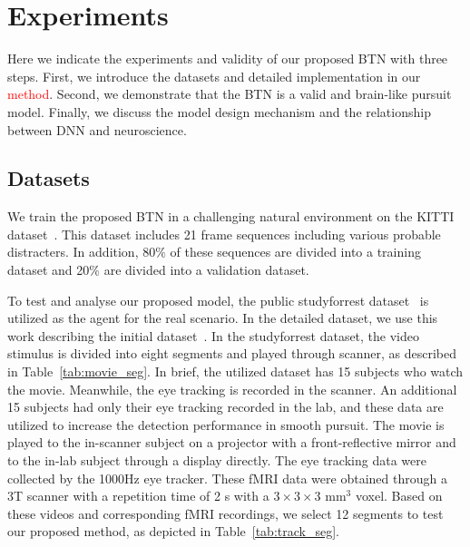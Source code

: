 \documentclass[final,3p,times,twocolumn]{elsarticle}
\begin{document}
\section{Experiments}
Here we indicate the experiments and validity of our proposed BTN with three steps. 
First, we introduce the datasets and detailed implementation in our \textcolor{red}{method}.
Second, we demonstrate that the BTN is a valid and brain-like pursuit model.
Finally, we discuss the model design mechanism and the relationship between DNN and neuroscience. 


\subsection{Datasets} \label{sec:datasets}
We train the proposed BTN in a challenging natural environment on the KITTI dataset~\cite{kitti}. 
This dataset includes 21 frame sequences including various probable distracters. 
In addition, 80$\%$ of these sequences are divided into a training dataset and 20$\%$ are divided into a validation dataset. 

To test and analyse our proposed model, the public studyforrest dataset~\cite{gaze_forrest} is utilized as the agent for the real scenario. 
In the detailed dataset, we use this work describing the initial dataset~\cite{gaze_forrest}. 
In the studyforrest dataset, the video stimulus is divided into eight segments 
and played through scanner, as described in Table~\ref{tab:movie_seg}. 
In brief, the utilized dataset has 15 subjects who watch the movie.
Meanwhile, the eye tracking is recorded in the scanner. 
An additional 15 subjects had only their eye tracking recorded in the lab, 
and these data are utilized to increase the detection performance in smooth pursuit. 
The movie is played to the in-scanner subject on a projector with a front-reflective mirror 
and to the in-lab subject through a display directly. 
The eye tracking data were collected by the 1000Hz eye tracker. 
These fMRI data were obtained through a 3T scanner with a repetition time of 2 s with a $3 \times 3 \times 3 $ mm$^3$ voxel. 
Based on these videos and corresponding fMRI recordings, we select 12 segments to test our proposed method, as depicted in Table~\ref{tab:track_seg}.
\end{document}
